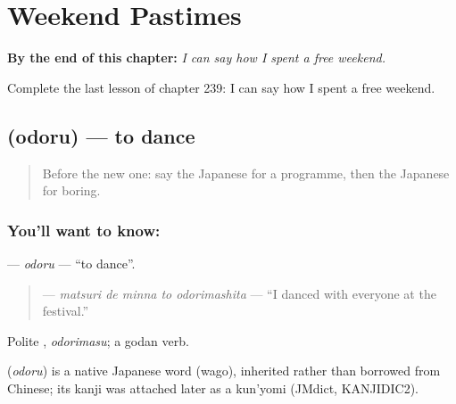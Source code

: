 
\chapter{Weekend Pastimes}
\label{ch:ja-weekend-pastimes}

\begin{chapteropening}
\textbf{By the end of this chapter:} \emph{I can say how I spent a free weekend.}

Complete the last lesson of chapter 239: I can say how I spent a free weekend.
\end{chapteropening}

\section[\texorpdfstring{\ja{おどる} (odoru)}{おどる (odoru)}]{ (odoru) — to dance}

\label{lesson:JA-C239-odoru}



\begin{quote}
Before the new one: say the Japanese for a programme, then the Japanese for boring.
\end{quote}

\subsection*{You'll want to know: }
\textbf{} — \emph{odoru} — \textquotedblleft{}to dance\textquotedblright{}.

\begin{quote}
\textbf{  } — \emph{matsuri de minna to odorimashita} — \textquotedblleft{}I danced with everyone at the festival.\textquotedblright{}
\end{quote}

Polite \textbf{}, \emph{odorimasu}; a godan verb.

\begin{cousinweb}
\textbf{} (\emph{odoru}) is a native Japanese word (wago), inherited rather than borrowed from Chinese; its kanji was attached later as a kun'yomi (JMdict, KANJIDIC2).
\end{cousinweb}

